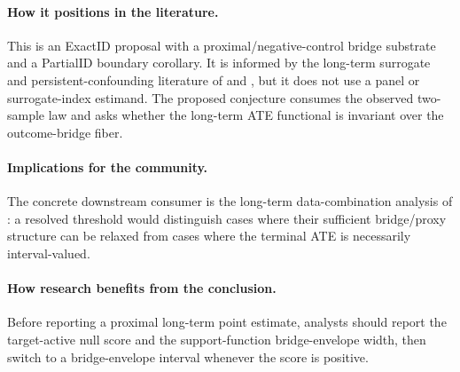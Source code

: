 \documentclass[11pt]{article}
\theoremstyle{definition}
\theoremstyle{plain}
\theoremstyle{remark}
\begin{document}
\paragraph{How it positions in the literature.}
This is an ExactID proposal with a proximal/negative-control bridge substrate
and a PartialID boundary corollary.  It is informed by the long-term surrogate
and persistent-confounding literature of \citet{AtheyChettyImbensKang2019} and
\citet{ImbensKallusMaoWang2025}, but it does not use a panel or surrogate-index
estimand.  The proposed conjecture consumes the observed two-sample law and asks
whether the long-term ATE functional is invariant over the outcome-bridge fiber.

\paragraph{Implications for the community.}
The concrete downstream consumer is the long-term data-combination analysis of
\citet{ImbensKallusMaoWang2025}: a resolved threshold would distinguish cases
where their sufficient bridge/proxy structure can be relaxed from cases where
the terminal ATE is necessarily interval-valued.

\paragraph{How research benefits from the conclusion.}
Before reporting a proximal long-term point estimate, analysts should report
the target-active null score and the support-function bridge-envelope width,
then switch to a bridge-envelope interval whenever the score is positive.
\end{document}

